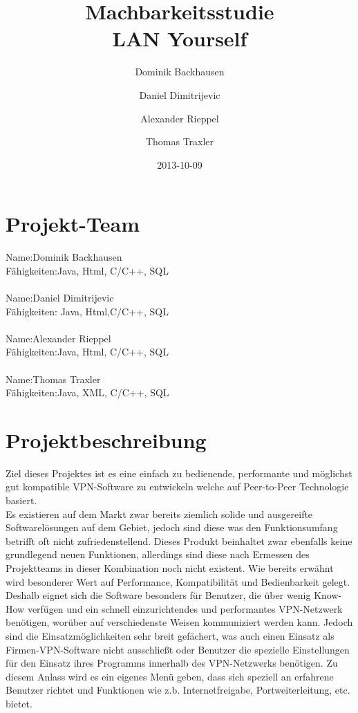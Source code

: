 \documentclass[a4paper,12pt]{scrreprt}
\begin{document}
\author{Dominik Backhausen\and Daniel Dimitrijevic\and Alexander Rieppel\and Thomas Traxler}
\title{Machbarkeitsstudie\\ LAN Yourself}
\date{2013-10-09}
\maketitle
\tableofcontents



\chapter{Projekt-Team}
	
	Name:Dominik Backhausen\\
	    Fähigkeiten:Java, Html, C/C++, SQL\\\\
	  	Name:Daniel Dimitrijevic
	\\ 	Fähigkeiten: Java, Html,C/C++, SQL    
	\\
	\\  Name:Alexander Rieppel
	\\
	    Fähigkeiten:Java, Html, C/C++, SQL
	    \\
	    \\
	    Name:Thomas Traxler
	    \\
	    Fähigkeiten:Java, XML, C/C++, SQL
	    \\
\chapter{Projektbeschreibung}
Ziel dieses Projektes ist es eine einfach zu bedienende, performante und möglichst gut kompatible VPN-Software zu entwickeln welche auf Peer-to-Peer Technologie basiert.\\

Es existieren auf dem Markt zwar bereits ziemlich solide und ausgereifte Softwarelösungen auf dem Gebiet, jedoch sind diese was den Funktionsumfang betrifft oft nicht zufriedenstellend. Dieses Produkt beinhaltet zwar ebenfalls keine grundlegend neuen Funktionen, allerdings sind diese nach Ermessen des Projektteams in dieser Kombination noch nicht existent. Wie bereits erwähnt wird besonderer Wert auf Performance, Kompatibilität und Bedienbarkeit gelegt. Deshalb eignet sich die Software besonders für Benutzer, die über wenig Know-How verfügen und ein schnell einzurichtendes und performantes VPN-Netzwerk benötigen, worüber auf verschiedenste Weisen kommuniziert werden kann. Jedoch sind die Einsatzmöglichkeiten sehr breit gefächert, was auch einen Einsatz als Firmen-VPN-Software nicht ausschließt oder Benutzer die spezielle Einstellungen für den Einsatz ihres Programms innerhalb des VPN-Netzwerks benötigen. Zu diesem Anlass wird es ein eigenes Menü geben, dass sich speziell an erfahrene Benutzer richtet und Funktionen wie z.b. Internetfreigabe, Portweiterleitung, etc. bietet.\\
\end{document}
